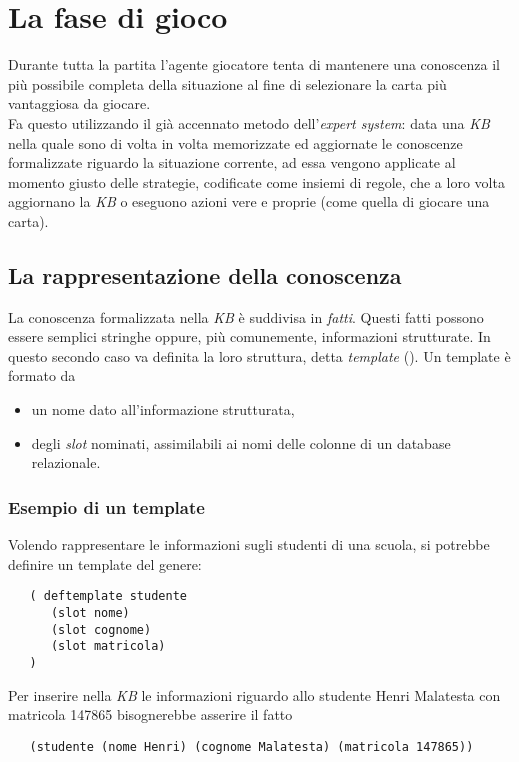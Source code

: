 \section{La fase di gioco}



Durante tutta la partita l'agente giocatore tenta di mantenere una conoscenza il più possibile completa della situazione al fine di selezionare la carta più vantaggiosa da giocare.\\
Fa questo utilizzando il già accennato metodo dell'\emph{expert system}: data una \emph{KB} nella quale sono di volta in volta memorizzate ed aggiornate le conoscenze formalizzate riguardo la situazione corrente, ad essa vengono applicate al momento giusto delle strategie, codificate come insiemi di regole, che a loro volta aggiornano la \emph{KB} o eseguono azioni vere e proprie (come quella di giocare una carta).



\subsection{La rappresentazione della conoscenza}

La conoscenza formalizzata nella \emph{KB} è suddivisa in \emph{fatti}.
Questi fatti possono essere semplici stringhe oppure, più comunemente, informazioni strutturate.
In questo secondo caso va definita la loro struttura, detta \emph{template} (\cite{jessbook}).
Un template è formato da
\begin{itemize}
   \item un nome dato all'informazione strutturata,
   \item degli \emph{slot} nominati, assimilabili ai nomi delle colonne di un database relazionale.
\end{itemize}


\subsubsection*{Esempio di un template}
Volendo rappresentare le informazioni sugli studenti di una scuola, si potrebbe definire un template del genere:
\begin{verbatim}
   ( deftemplate studente 
      (slot nome)
      (slot cognome)
      (slot matricola)
   )
\end{verbatim}
Per inserire nella \emph{KB} le informazioni riguardo allo studente Henri Malatesta con matricola 147865 bisognerebbe asserire il fatto
\begin{verbatim}
   (studente (nome Henri) (cognome Malatesta) (matricola 147865))
\end{verbatim}


